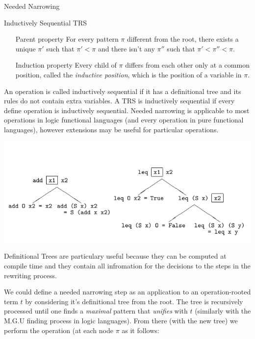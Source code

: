 \documentclass{beamer}
\begin{document}
\begin{section}{Needed Narrowing}
\begin{subsection}{Inductively Sequential TRS}
\begin{frame}
  \begin{itemize}
    \setlength{\itemindent}{2cm}
  \item[Parent property] For every pattern $\pi$ different from the root, there exists a unique $\pi'$ such that $\pi' < \pi$ and there isn't any $\pi''$ such that $\pi' < \pi'' < \pi$.
  \item[Induction property] Every child of $\pi$ differs from each other only at a common position, called the \textit{inductive position}, which is the position of a variable in $\pi$.
  \end{itemize}
    An operation is called inductively sequential if it has a definitional tree and its rules do not contain extra variables. A TRS is inductively sequential if every define operation is inductively sequential. Needed narrowing is applicable to most operations in logic functional languages (and every operation in pure functional languages), however extensions may be useful for particular operations.
\end{frame}

\begin{frame}

\includegraphics[scale=0.5]{pictures/def_trees.png}
  
\end{frame}

\begin{frame}

  Definitional Trees are particulary useful because they can be computed at compile time and they contain all infromation for the decisions to the steps in the rewriting process.

  We could define a needed narrowing step as an application to an operation-rooted term $t$ by considering it's definitional tree from the root. The tree is recursively processed until one finds a \textit{maximal} pattern that \textit{unifies} with $t$ (similarly with the M.G.U finding process in logic languages). From there (with the new tree) we perform the operation (at each node $\pi$ as it follows:


\end{frame}
\end{subsection}
\end{section}
\end{document}
